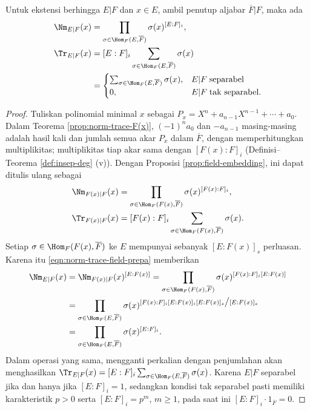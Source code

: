 \begin{theorem}\label{prop:norm-trace-field}
	Untuk ekstensi berhingga $E|F$ dan $x \in E$, ambil penutup aljabar $\overline{F}|F$, maka ada
	\begin{align*}
		\Nm_{E|F}(x) & = \prod_{\sigma \in \Hom_F(E, \overline{F})} \sigma(x)^{[E:F]_i}, \\
		\Tr_{E|F}(x) & = [E:F]_i \sum_{\sigma \in \Hom_F(E, \overline{F})} \sigma(x) \\
		& = \begin{cases}
			\sum_{\sigma \in \Hom_F(E, \overline{F})} \sigma(x), & E|F\; \text{separabel} \\
			0, & E|F\; \text{tak separabel}.
		\end{cases}
	\end{align*}
\end{theorem}
\begin{proof}
	Tuliskan polinomial minimal $x$ sebagai $P_x = X^n + a_{n-1}X^{n-1} + \cdots + a_0$. Dalam Teorema \ref{prop:norm-trace-F(x)}, $(-1)^n a_0$ dan $-a_{n-1}$ masing-masing adalah hasil kali dan jumlah semua akar $P_x$ dalam $\overline{F}$, dengan memperhitungkan multiplikitas; multiplikitas tiap akar sama dengan $[F(x):F]_i$ (Definisi--Teorema \ref{def:insep-deg} (v)). Dengan Proposisi \ref{prop:field-embedding}, ini dapat ditulis ulang sebagai
	\begin{align*}
		\Nm_{F(x)|F}(x) & = \prod_{\sigma \in \Hom_F(F(x), \overline{F})} \sigma(x)^{[F(x):F]_i} , \\
		\Tr_{F(x)|F}(x) & = [F(x):F]_i \sum_{\sigma \in \Hom_F(F(x), \overline{F})} \sigma(x).
	\end{align*}
	Setiap $\sigma \in \Hom_F(F(x), \overline{F})$ ke $E$ mempunyai sebanyak $[E: F(x)]_s$ perluasan. Karena itu \eqref{eqn:norm-trace-field-prepa} memberikan
	\begin{align*}
		\Nm_{E|F}(x) & = \Nm_{F(x)|F}(x)^{[E:F(x)]} = \prod_{\sigma \in \Hom_F(F(x), \overline{F})} \sigma(x)^{[F(x):F]_i [E:F(x)]} \\
		& = \prod_{\sigma \in \Hom_F(E, \overline{F})} \sigma(x)^{[F(x):F]_i [E:F(x)]_i [E:F(x)]_s \big/ [E:F(x)]_s} \\
		& = \prod_{\sigma \in \Hom_F(E, \overline{F})} \sigma(x)^{[E:F]_i}.
	\end{align*}
	Dalam operasi yang sama, mengganti perkalian dengan penjumlahan akan menghasilkan $\Tr_{E|F}(x) = [E:F]_i \sum_{\sigma \in \Hom_F(E, \overline{F})} \sigma(x)$. Karena $E|F$ separabel jika dan hanya jika $[E:F]_i = 1$, sedangkan kondisi tak separabel pasti memiliki karakteristik $p > 0$ serta $[E:F]_i = p^m$, $m \geq 1$, pada saat ini $[E:F]_i \cdot 1_{\overline{F}} = 0$.
\end{proof}

